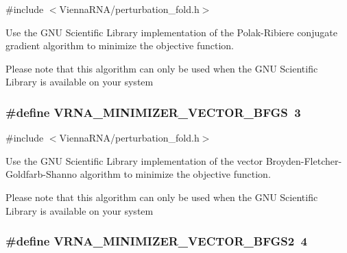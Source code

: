{\ttfamily \#include $<$Vienna\+R\+N\+A/perturbation\+\_\+fold.\+h$>$}



Use the G\+N\+U Scientific Library implementation of the Polak-\/\+Ribiere conjugate gradient algorithm to minimize the objective function. 

Please note that this algorithm can only be used when the G\+N\+U Scientific Library is available on your system \hypertarget{group__soft__constraints_ga9be8a702cddf58235571ace11cc41b22}{
\subsubsection[{V\+R\+N\+A\+\_\+\+M\+I\+N\+I\+M\+I\+Z\+E\+R\+\_\+\+V\+E\+C\+T\+O\+R\+\_\+\+B\+F\+G\+S}]{\setlength{\rightskip}{0pt plus 5cm}\#define V\+R\+N\+A\+\_\+\+M\+I\+N\+I\+M\+I\+Z\+E\+R\+\_\+\+V\+E\+C\+T\+O\+R\+\_\+\+B\+F\+G\+S~3}}\label{group__soft__constraints_ga9be8a702cddf58235571ace11cc41b22}


{\ttfamily \#include $<$Vienna\+R\+N\+A/perturbation\+\_\+fold.\+h$>$}



Use the G\+N\+U Scientific Library implementation of the vector Broyden-\/\+Fletcher-\/\+Goldfarb-\/\+Shanno algorithm to minimize the objective function. 

Please note that this algorithm can only be used when the G\+N\+U Scientific Library is available on your system \hypertarget{group__soft__constraints_ga7b0a65c6c92fa1d8012383ba9d3dcb4f}{
\subsubsection[{V\+R\+N\+A\+\_\+\+M\+I\+N\+I\+M\+I\+Z\+E\+R\+\_\+\+V\+E\+C\+T\+O\+R\+\_\+\+B\+F\+G\+S2}]{\setlength{\rightskip}{0pt plus 5cm}\#define V\+R\+N\+A\+\_\+\+M\+I\+N\+I\+M\+I\+Z\+E\+R\+\_\+\+V\+E\+C\+T\+O\+R\+\_\+\+B\+F\+G\+S2~4}}\label{group__soft__constraints_ga7b0a65c6c92fa1d8012383ba9d3dcb4f}



